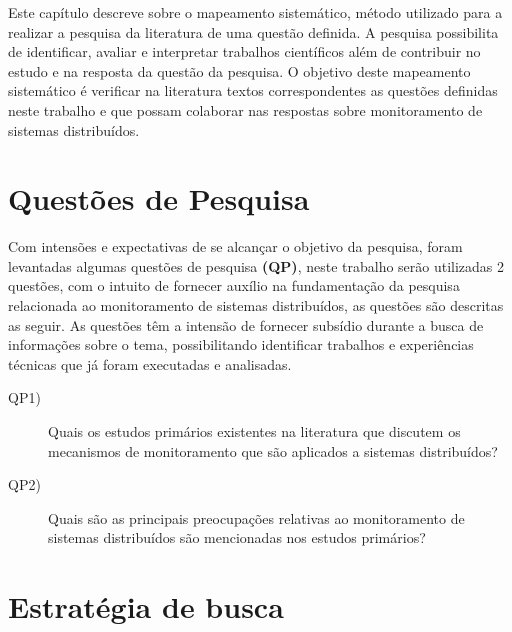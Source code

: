 \label{mapeamento_sistematico}

Este capítulo descreve sobre o mapeamento sistemático, método utilizado para a realizar a pesquisa da literatura de uma questão definida. A pesquisa possibilita de identificar, avaliar e interpretar trabalhos científicos além de contribuir no estudo e na resposta da questão da pesquisa\cite{kitchenham2007guidelines,petticrew2008systematic,de2018mapeamento}. O objetivo deste mapeamento sistemático é verificar na literatura textos correspondentes as questões definidas neste trabalho e que possam colaborar nas respostas sobre monitoramento de sistemas distribuídos.


\section{Questões de Pesquisa}
\label{questoes1e2}

Com intensões e expectativas de se alcançar o objetivo da pesquisa, foram levantadas algumas questões de pesquisa \textbf{(QP)}, neste trabalho serão utilizadas 2 questões, com o intuito de fornecer auxílio na fundamentação da pesquisa relacionada ao monitoramento de sistemas distribuídos, as questões são descritas as seguir. As questões têm a intensão de fornecer subsídio durante a busca de informações sobre o tema, possibilitando identificar trabalhos e experiências técnicas que já foram executadas e analisadas\cite{feltrim2004abordagem}.

\begin{description}
\item[QP1)] Quais os estudos primários existentes na literatura que discutem os mecanismos de monitoramento 
que são aplicados a sistemas distribuídos?
\item[QP2)] Quais são as principais preocupações relativas ao monitoramento de sistemas distribuídos são mencionadas nos estudos primários?
\end{description}


\section{Estratégia de busca}
\label{sec:stringbusca}

